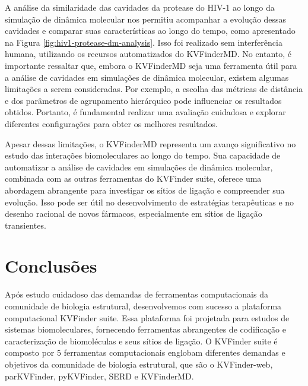 \documentclass[Portugues]{phdquali}
\begin{document}
A análise da similaridade das cavidades da protease do HIV-1 ao longo da simulação de dinâmica molecular nos permitiu acompanhar a evolução dessas cavidades e comparar suas características ao longo do tempo, como apresentado na Figura \ref{fig:hiv1-protease-dm-analysis}. Isso foi realizado sem interferência humana, utilizando os recursos automatizados do KVFinderMD. No entanto, é importante ressaltar que, embora o KVFinderMD seja uma ferramenta útil para a análise de cavidades em simulações de dinâmica molecular, existem algumas limitações a serem consideradas. Por exemplo, a escolha das métricas de distância e dos parâmetros de agrupamento hierárquico pode influenciar os resultados obtidos. Portanto, é fundamental realizar uma avaliação cuidadosa e explorar diferentes configurações para obter os melhores resultados. %

Apesar dessas limitações, o KVFinderMD representa um avanço significativo no estudo das interações biomoleculares ao longo do tempo. Sua capacidade de automatizar a análise de cavidades em simulações de dinâmica molecular, combinada com as outras ferramentas do KVFinder suite, oferece uma abordagem abrangente para investigar os sítios de ligação e compreender sua evolução. Isso pode ser útil no desenvolvimento de estratégias terapêuticas e no desenho racional de novos fármacos, especialmente em sítios de ligação transientes.



\chapter{Conclusões}

Após estudo cuidadoso das demandas de ferramentas computacionais da comunidade de biologia estrutural, desenvolvemos com sucesso a plataforma computacional KVFinder suite. Essa plataforma foi projetada para estudos de sistemas biomoleculares, fornecendo ferramentas abrangentes de codificação e caracterização de biomoléculas e seus sítios de ligação. O KVFinder suite é composto por 5 ferramentas computacionais englobam diferentes demandas e objetivos da comunidade de biologia estrutural, que são o KVFinder-web, parKVFinder, pyKVFinder, SERD e KVFinderMD. 
\end{document}
